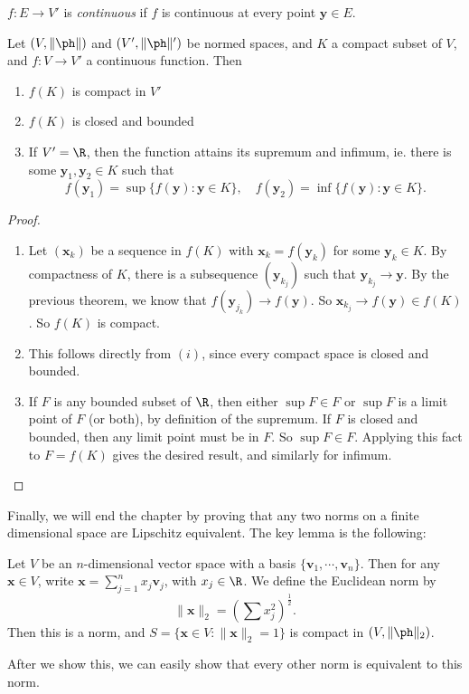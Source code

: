 \documentclass[a4paper]{article}
\begin{document}
\begin{defi}
  $f: E \to V'$ is \emph{continuous} if $f$ is continuous at every point $\mathbf{y} \in E$.
\end{defi}

\begin{thm}
  Let $(V, \|\ph\|)$ and $(V', \|\ph\|')$ be normed spaces, and $K$ a compact subset of $V$, and $f: V \to V'$ a continuous function. Then
  \begin{enumerate}
    \item $f(K)$ is compact in $V'$
    \item $f(K)$ is closed and bounded
    \item If $V' = \R$, then the function attains its supremum and infimum, ie. there is some $\mathbf{y}_1, \mathbf{y}_2 \in K$ such that
      \[
        f(\mathbf{y}_1) = \sup\{f(\mathbf{y}): \mathbf{y} \in K\},\quad f(\mathbf{y}_2) = \inf\{f(\mathbf{y}): \mathbf{y} \in K\}.
      \]
  \end{enumerate}
\end{thm}

\begin{proof}\leavevmode
  \begin{enumerate}
    \item Let $(\mathbf{x}_k)$ be a sequence in $f(K)$ with $\mathbf{x}_k = f(\mathbf{y}_k)$ for some $\mathbf{y}_k \in K$. By compactness of $K$, there is a subsequence $(\mathbf{y}_{k_j})$ such that $\mathbf{y}_{k_j} \to \mathbf{y}$. By the previous theorem, we know that $f(\mathbf{y}_{j_k}) \to f(\mathbf{y})$. So $\mathbf{x}_{k_j} \to f(\mathbf{y}) \in f(K)$. So $f(K)$ is compact.
    \item This follows directly from $(i)$, since every compact space is closed and bounded.
    \item If $F$ is any bounded subset of $\R$, then either $\sup F \in F$ or $\sup F$ is a limit point of $F$ (or both), by definition of the supremum. If $F$ is closed and bounded, then any limit point must be in $F$. So $\sup F \in F$. Applying this fact to $F = f(K)$ gives the desired result, and similarly for infimum.
  \end{enumerate}
\end{proof}

Finally, we will end the chapter by proving that any two norms on a finite dimensional space are Lipschitz equivalent. The key lemma is the following:
\begin{lemma}
  Let $V$ be an $n$-dimensional vector space with a basis $\{\mathbf{v}_1, \cdots, \mathbf{v}_n\}$. Then for any $\mathbf{x} \in V$, write $\mathbf{x} = \sum_{j = 1}^n x_j \mathbf{v}_j$, with $x_j \in \R$. We define the Euclidean norm by
  \[
    \|\mathbf{x}\|_2 = \left(\sum x_j^2\right)^{\frac{1}{2}}.
  \]
  Then this is a norm, and $S = \{\mathbf{x} \in V: \|\mathbf{x}\|_2 = 1\}$ is compact in $(V, \|\ph\|_2)$.
\end{lemma}
After we show this, we can easily show that every other norm is equivalent to this norm.
\end{document}
